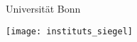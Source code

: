 %
%
%
{\thispagestyle{empty}
  \addtolength{\oddsidemargin}{1.0cm}\addtolength{\topmargin}{1.0cm}
  \rmfamily\setlength{\parindent}{0pt}
  \begin{center}
    {\fontsize{44}{50}\selectfont
      Universität Bonn}

    \vspace*{20pt}

    \begin{singlespace}
      \fontsize{30}{40}\selectfont
      \InstituteName
    \end{singlespace}

    \vspace*{40pt}

    \begin{onehalfspace}
      \bfseries\huge
      \thesistitle
    \end{onehalfspace}

    \vspace*{20pt}

    {\huge
      \thesisauthor
    }
  \end{center}

  \vspace*{\fill}

  \thesisabstract

  \vspace*{\fill}

  {\normalfont\normalsize
    \parbox{0.3\textwidth}{\InstituteAddress}
    \parbox{0.4\textwidth}{%
      \centering
      \texttt{[image: instituts\_siegel]}
    }
    \parbox{0.3\textwidth}{%
      \thesisnumber\\
      \thesismonth{} \thesisyear
    }
  }
}
